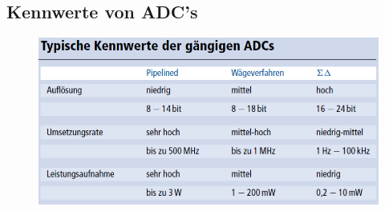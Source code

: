 \subsection{Kennwerte von ADC's}
\begin{figure}[!htbp]
\includegraphics[scale=0.4]{pictures/kennwerteADC}
\end{figure}

